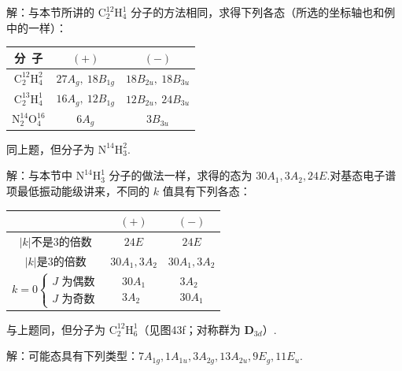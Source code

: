 \begin{xiti}
解：与本节所讲的 $\mathrm{C_2^{12}H_4^1}$ 分子的方法相同，求得下列各态（所选的坐标轴也和例中的一样）：
\begin{center}
\begin{tabular}{|c|c|c|}
\hline
  分\ 子 & $(+)$ & $(-)$\\ \hline
  $\mathrm{C_2^{12}H_4^2}$ & $27A_g,\ 18B_{1g}$ & $18B_{2u},\ 18B_{3u}$\\ \hline
  $\mathrm{C_2^{13}H_4^1}$ & $16A_g,\ 12B_{1g}$ & $12B_{2u},\ 24B_{3u}$\\ \hline
  $\mathrm{N_2^{14}O_4^{16}}$ & $6A_g$ & $3B_{3u}$\\ \hline
\end{tabular}
\end{center}

\quad 同上题，但分子为 $\mathrm{N^{14}H_3^2}$.

解：与本节中 $\mathrm{N^{14}H_3^1}$ 分子的做法一样，求得的态为 $30A_1,3A_2,24E$.对基态电子谱项最低振动能级讲来，不同的 $k$ 值具有下列各态：
\begin{center}
\begin{tabular}{|c|c|c|}
\hline
  & $(+)$ & $(-)$\\ \hline
  $|k|$不是3的倍数 & $24E$ & $24E$\\ \hline
  $|k|$是3的倍数 & $30A_1,3A_2$ & $30A_1,3A_2$\\ \hline
  $k=0\left\{\begin{array}{l}J\text{ 为偶数}\\ J\text{ 为奇数}\end{array}\right.$
  & $\begin{array}{c}30A_1\\ 3A_2\end{array}$
  & $\begin{array}{c}3A_2\\ 30A_1\end{array}$\\ \hline
\end{tabular}
\end{center}

\quad 与上题同，但分子为 $\mathrm{C_2^{12}H_6^1}$（见图43f；对称群为 $\boldsymbol{D}_{3d}$）.

解：可能态具有下列类型：$7A_{1g},1A_{1u},3A_{2g},13A_{2u},9E_g,11E_u$.


\end{xiti}
